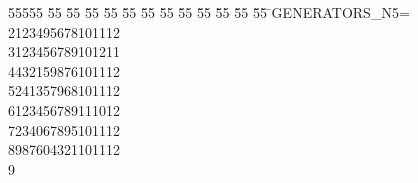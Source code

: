 %
%
\begin{tabbing}
55555 \= 55 \= 55 \= 55 \= 55 \= 55 \= 55 \= 55 \= 55 \= 55 \= 55 \= 55 \= 55 \= \>GENERATORS\_N5=\\[0pt]
2123495678101112\ \\[0pt]
3123456789101211\ \\[0pt]
4432159876101112\ \\[0pt]
5241357968101112\ \\[0pt]
6123456789111012\ \\[0pt]
7234067895101112\ \\[0pt]
8987604321101112\\[0pt]
9\>\end{tabbing}
